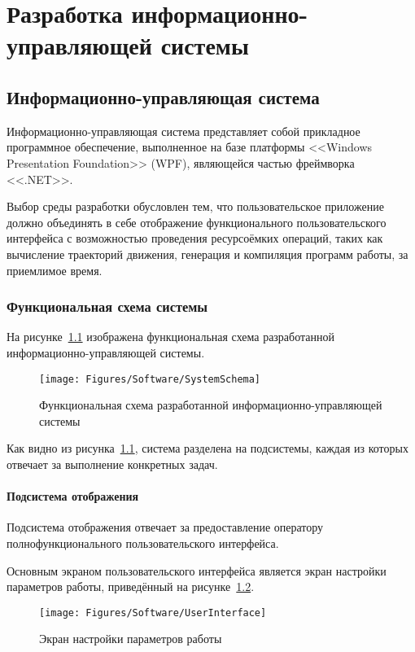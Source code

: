 \chapter{Разработка информационно-управляющей системы}


\section{Информационно-управляющая система}
Информационно-управляющая система представляет собой прикладное программное обеспечение, выполненное на базе платформы <<Windows Presentation Foundation>> (WPF), являющейся частью фреймворка <<.NET>>.

Выбор среды разработки обусловлен тем, что пользовательское приложение должно объединять в себе отображение функционального пользовательского интерфейса с возможностью проведения ресурсоёмких операций, таких как вычисление траекторий движения, генерация и компиляция программ работы, за приемлимое время.

\subsection{Функциональная схема системы}
На рисунке~\ref{fig:Software:SystemSchema} изображена функциональная схема разработанной информационно-управляющей системы.

\begin{figure}[H]
    \centering
    \vspace{14pt}
    \texttt{[image: Figures/Software/SystemSchema]}
    \caption{Функциональная схема разработанной информационно-управляющей системы}
    \label{fig:Software:SystemSchema}
\end{figure}

Как видно из рисунка~\ref{fig:Software:SystemSchema}, система разделена на подсистемы, каждая из которых отвечает за выполнение конкретных задач.

\subsubsection*{Подсистема отображения}
Подсистема отображения отвечает за предоставление оператору полнофункционального пользовательского интерфейса.

Основным экраном пользовательского интерфейса является экран настройки параметров работы, приведённый на рисунке~\ref{fig:Software:UserInterface}.

\begin{figure}[H]
    \centering
    \vspace{14pt}
    \texttt{[image: Figures/Software/UserInterface]}
    \caption{Экран настройки параметров работы}
    \label{fig:Software:UserInterface}
\end{figure}

